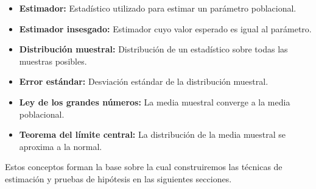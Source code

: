 \begin{itemize}
	\item \textbf{Estimador:} Estadístico utilizado para estimar un parámetro poblacional.
	\item \textbf{Estimador insesgado:} Estimador cuyo valor esperado es igual al parámetro.
	\item \textbf{Distribución muestral:} Distribución de un estadístico sobre todas las muestras posibles.
	\item \textbf{Error estándar:} Desviación estándar de la distribución muestral.
	\item \textbf{Ley de los grandes números:} La media muestral converge a la media poblacional.
	\item \textbf{Teorema del límite central:} La distribución de la media muestral se aproxima a la normal.
\end{itemize}

Estos conceptos forman la base sobre la cual construiremos las técnicas de estimación y pruebas de hipótesis en las siguientes secciones.
